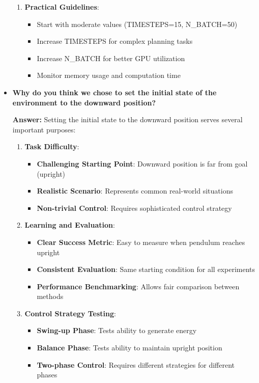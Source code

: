 \begin{itemize}
\begin{enumerate}
        \item \textbf{Practical Guidelines}:
        \begin{itemize}
            \item Start with moderate values (TIMESTEPS=15, N\_BATCH=50)
            \item Increase TIMESTEPS for complex planning tasks
            \item Increase N\_BATCH for better GPU utilization
            \item Monitor memory usage and computation time
        \end{itemize}
    \end{enumerate}
    
    \item \textbf{Why do you think we chose to set the initial state of the environment to the downward position?}
    
    \textbf{Answer:} Setting the initial state to the downward position serves several important purposes:
    
    \begin{enumerate}
        \item \textbf{Task Difficulty}:
        \begin{itemize}
            \item \textbf{Challenging Starting Point}: Downward position is far from goal (upright)
            \item \textbf{Realistic Scenario}: Represents common real-world situations
            \item \textbf{Non-trivial Control}: Requires sophisticated control strategy
        \end{itemize}
        
        \item \textbf{Learning and Evaluation}:
        \begin{itemize}
            \item \textbf{Clear Success Metric}: Easy to measure when pendulum reaches upright
            \item \textbf{Consistent Evaluation}: Same starting condition for all experiments
            \item \textbf{Performance Benchmarking}: Allows fair comparison between methods
        \end{itemize}
        
        \item \textbf{Control Strategy Testing}:
        \begin{itemize}
            \item \textbf{Swing-up Phase}: Tests ability to generate energy
            \item \textbf{Balance Phase}: Tests ability to maintain upright position
            \item \textbf{Two-phase Control}: Requires different strategies for different phases
        \end{itemize}
        

\end{enumerate}
\end{itemize}
